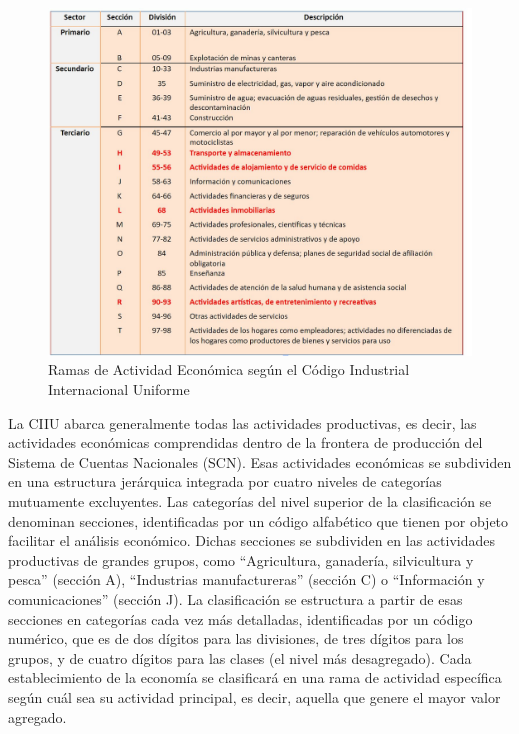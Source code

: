 \documentclass[
  openany]{book}
\begin{document}
\begin{figure}

{\centering \includegraphics[width=1\linewidth]{imagenes/figura1.1} 

}

\caption{Ramas de Actividad Económica según el Código Industrial Internacional Uniforme}\label{fig:ciiu}
\end{figure}

La CIIU abarca generalmente todas las actividades productivas, es decir, las actividades económicas comprendidas dentro de la frontera de producción del Sistema de Cuentas Nacionales (SCN). Esas actividades económicas se subdividen en una estructura jerárquica integrada por cuatro niveles de categorías mutuamente excluyentes. Las categorías del nivel superior de la clasificación se denominan secciones, identificadas por un código alfabético que tienen por objeto facilitar el análisis económico. Dichas secciones se subdividen en las actividades productivas de grandes grupos, como ``Agricultura, ganadería, silvicultura y pesca'' (sección A), ``Industrias manufactureras'' (sección C) o ``Información y comunicaciones'' (sección J). La clasificación se estructura a partir de esas secciones en categorías cada vez más detalladas, identificadas por un código numérico, que es de dos dígitos para las divisiones, de tres dígitos para los grupos, y de cuatro dígitos para las clases (el nivel más desagregado). Cada establecimiento de la economía se clasificará en una rama de actividad específica según cuál sea su actividad principal, es decir, aquella que genere el mayor valor agregado.
\end{document}
